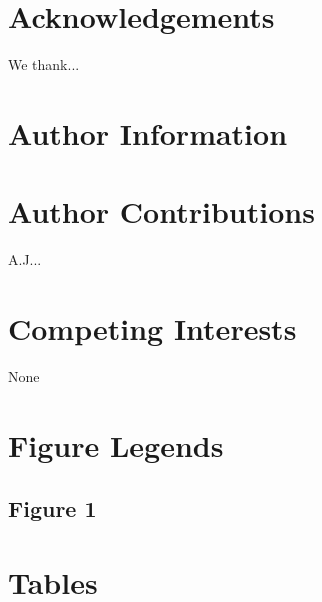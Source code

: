\documentclass[letterpaper]{article}
\begin{document}
\section*{Acknowledgements}

We thank...

\section*{Author Information}

\section*{Author Contributions}

A.J...

\section*{Competing Interests}

None

\section*{Figure Legends}

\subsection*{Figure 1}

\section*{Tables}
\end{document}

